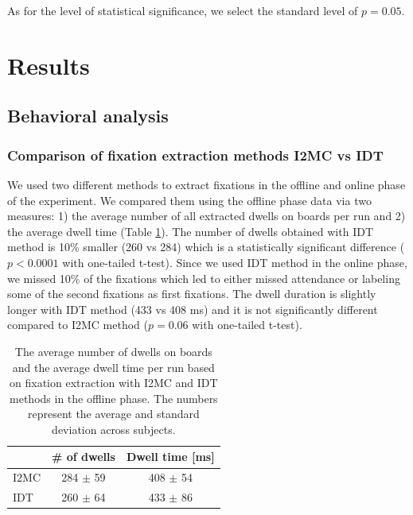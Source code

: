 \documentclass[12pt]{iopart}
\begin{document}
As for the level of statistical significance, we select the standard level of $p = 0.05$.

\section{Results}
\label{sec:results}
\subsection{Behavioral analysis}

\subsubsection*{Comparison of fixation extraction methods I2MC vs IDT}
We used two different methods to extract fixations in the offline 
and online phase of the experiment. We compared them using
the offline phase data via two measures: 1) the average number of all extracted
dwells on boards per run and 2) the average dwell time (Table \ref{tab:EyeMethods}).
The number of dwells obtained with IDT method is 10\% smaller (260 vs 284)
which is a statistically significant difference
($p < 0.0001$ with one-tailed t-test).
Since we used IDT method in the online phase,
we missed 10\% of the fixations which led
to either missed attendance or labeling some of the second
fixations as first fixations.
The dwell duration is slightly longer with IDT method (433 vs 408 ms)
and it is not significantly different compared to I2MC method
($p = 0.06$ with one-tailed t-test).

\begin{table}
    \centering
    \caption{The average number of dwells on boards and the average 
        dwell time per run
    based on fixation extraction with I2MC and IDT methods in the
    offline phase.
    The numbers represent the average and standard deviation across subjects.
}
    \begin{tabular}{l | c |c}
        \hline 
        & \# of dwells & Dwell time [ms] \\
        \hline 
        I2MC & 284 $\pm$ 59  & 408 $\pm$ 54 \\
        IDT & 260 $\pm$ 64  & 433 $\pm$ 86 \\
        \hline 
    \end{tabular}
    \label{tab:EyeMethods}
\end{table}
\end{document}
